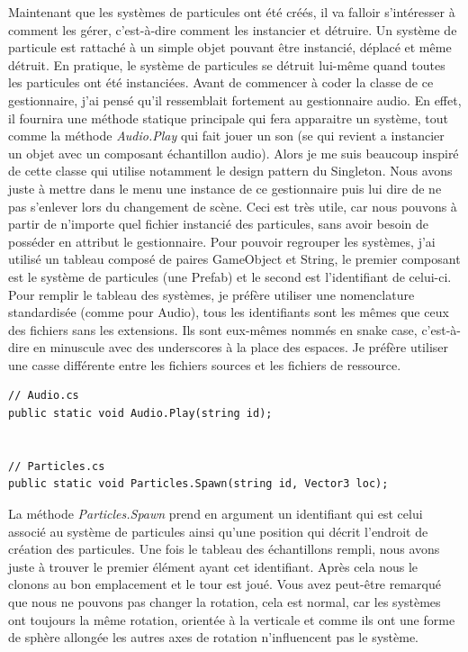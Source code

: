 \documentclass{article}
\begin{document}
Maintenant que les systèmes de particules ont été créés, il va falloir s'intéresser à comment les gérer, c'est-à-dire comment les instancier et détruire.
Un système de particule est rattaché à un simple objet pouvant être instancié, déplacé et même détruit. En pratique, le système de particules se détruit lui-même quand toutes les particules ont été instanciées.
Avant de commencer à coder la classe de ce gestionnaire, j'ai pensé qu'il ressemblait fortement au gestionnaire audio. En effet, il fournira une méthode statique principale qui fera apparaitre un système, tout comme la méthode \emph{Audio.Play} qui fait jouer un son (se qui revient a instancier un objet avec un composant échantillon audio). Alors je me suis beaucoup inspiré de cette classe qui utilise notamment le design pattern du Singleton. Nous avons juste à mettre dans le menu une instance de ce gestionnaire puis lui dire de ne pas s'enlever lors du changement de scène. Ceci est très utile, car nous pouvons à partir de n'importe quel fichier instancié des particules, sans avoir besoin de posséder en attribut le gestionnaire.
Pour pouvoir regrouper les systèmes, j'ai utilisé un tableau composé de paires GameObject et String, le premier composant est le système de particules (une Prefab) et le second est l'identifiant de celui-ci. Pour remplir le tableau des systèmes, je préfère utiliser une nomenclature standardisée (comme pour Audio), tous les identifiants sont les mêmes que ceux des fichiers sans les extensions. Ils sont eux-mêmes nommés en snake case, c'est-à-dire en minuscule avec des underscores à la place des espaces. Je préfère utiliser une casse différente entre les fichiers sources et les fichiers de ressource.




\begin{lstlisting}
// Audio.cs
public static void Audio.Play(string id);


// Particles.cs
public static void Particles.Spawn(string id, Vector3 loc);
\end{lstlisting}


La méthode \emph{Particles.Spawn} prend en argument un identifiant qui est celui associé au système de particules ainsi qu'une position qui décrit l'endroit de création des particules. Une fois le tableau des échantillons rempli, nous avons juste à trouver le premier élément ayant cet identifiant. Après cela nous le clonons au bon emplacement et le tour est joué. Vous avez peut-être remarqué que nous ne pouvons pas changer la rotation, cela est normal, car les systèmes ont toujours la même rotation, orientée à la verticale et comme ils ont une forme de sphère allongée les autres axes de rotation n'influencent pas le système.
\end{document}
